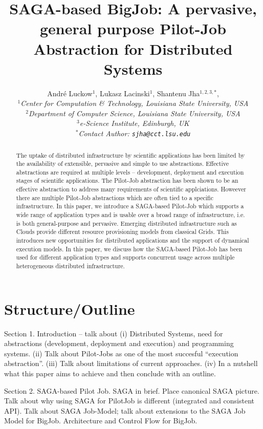 \documentclass[conference,final]{IEEEtran}
\title{SAGA-based BigJob: A pervasive, general purpose Pilot-Job Abstraction for Distributed Systems}
\author{
Andr\'e Luckow$^{1}$, Lukasz Lacinski$^{1}$,   Shantenu Jha$^{1,2,3,*}$,\\
  \small{\emph{$^{1}$Center for Computation \& Technology, Louisiana State University, USA}}\\
  \small{\emph{$^{2}$Department of Computer Science, Louisiana State University, USA}}\\
  \small{\emph{$^{3}$e-Science Institute, Edinburgh, UK}}\\
  \small{\emph{$^{*}$Contact Author: \texttt{sjha@cct.lsu.edu}}}\\
}
\newcommand{\up}{\vspace*{-1em}}
\begin{document}
 

\maketitle    


\begin{abstract}
  The uptake of distributed infrastructure by scientific applications
  has been limited by the availability of extensible, pervasive and
  simple to use abstractions. Effective abstractions are required at
  multiple levels -- development, deployment and execution stages of
  scientific applications. The Pilot-Job abstraction has been shown to
  be an effective abstraction to address many requirements of
  scientific applciations. Howeever there are multiple Pilot-Job
  abstractions which are often tied to a specific infrastructure.  In
  this paper, we introduce a SAGA-based Pilot-Job which supports a
  wide range of application types and is usable over a broad range of
  infrastructure, i.e. is both general-purpose and pervasive.
  Emerging distributed infrastructure such as Clouds provide different
  resource provisioning models from classical Grids. This introduces
  new opportunities for distributed applications and the support of
  dynamical execution models. In this paper, we discuss how the
  SAGA-based Pilot-Job has been used for different application types
  and supports concurrent usage across multiple heterogeneous
  distributed infrastructure.
\end{abstract}


\section*{Structure/Outline}

Section 1. Introduction -- talk about (i) Distributed Systems, need
for abstractions (development, deployment and execution) and
programming systems. (ii) Talk about Pilot-Jobs as one of the most
succesful ``execution abstraction''. (iii) Talk about limitations of
current approaches. (iv) In a nutshell what this paper aims to achieve
and then conclude with an outline.

\bigskip

Section 2. SAGA-based Pilot Job.  SAGA in brief. Place canonical SAGA
picture. Talk about why using SAGA for PilotJob is different
(integrated and consistent API). Talk about SAGA Job-Model; talk about
extensions to the SAGA Job Model for BigJob.  Architecture and Control
Flow for BigJob.
\end{document}
